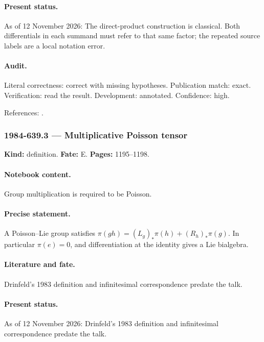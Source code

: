 \paragraph{Present status.} As of 12 November 2026: The direct-product construction is classical. Both differentials in each summand must refer to that same factor; the repeated source labels are a local notation error.

\paragraph{Audit.} Literal correctness: correct with missing hypotheses. Publication match: exact. Verification: read the result. Development: annotated. Confidence: high.

\noindent References: \citep{drinfeld1983hamiltonian}.\par

\subsubsection{1984-639.3 --- Multiplicative Poisson tensor}

\label{item:1984-639.3}

\noindent\textbf{Kind:} definition. \textbf{Fate:} E. \textbf{Pages:} 1195--1198.\par

\paragraph{Notebook content.} Group multiplication is required to be Poisson.

\paragraph{Precise statement.} A Poisson--Lie group satisfies \(\pi(gh)=(L_g)_*\pi(h)+(R_h)_*\pi(g)\). In particular \(\pi(e)=0\), and differentiation at the identity gives a Lie bialgebra.

\paragraph{Literature and fate.} Drinfeld's 1983 definition and infinitesimal correspondence predate the talk.

\paragraph{Present status.} As of 12 November 2026: Drinfeld's 1983 definition and infinitesimal correspondence predate the talk.


